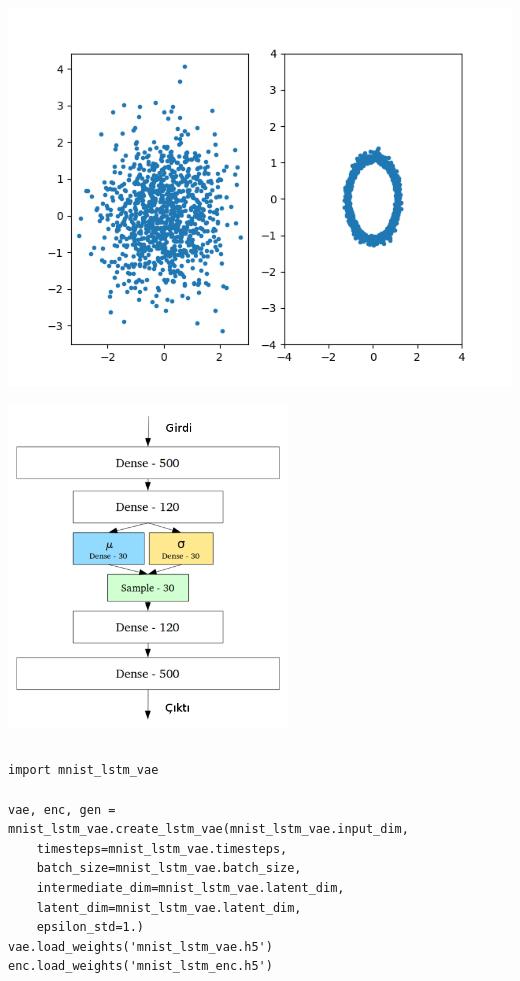 \documentclass[12pt,fleqn]{article}\usepackage{../../common}
\begin{document}
\includegraphics[width=40em]{autoenc_10.png}

\includegraphics[width=20em]{autoenc_07.png}

\inputminted[fontsize=\footnotesize]{python}{mnist_lstm_vae.py}

\begin{verbatim}
import mnist_lstm_vae

vae, enc, gen = mnist_lstm_vae.create_lstm_vae(mnist_lstm_vae.input_dim, 
    timesteps=mnist_lstm_vae.timesteps, 
    batch_size=mnist_lstm_vae.batch_size, 
    intermediate_dim=mnist_lstm_vae.latent_dim,
    latent_dim=mnist_lstm_vae.latent_dim,
    epsilon_std=1.)
vae.load_weights('mnist_lstm_vae.h5')
enc.load_weights('mnist_lstm_enc.h5')
\end{verbatim}
\end{document}
